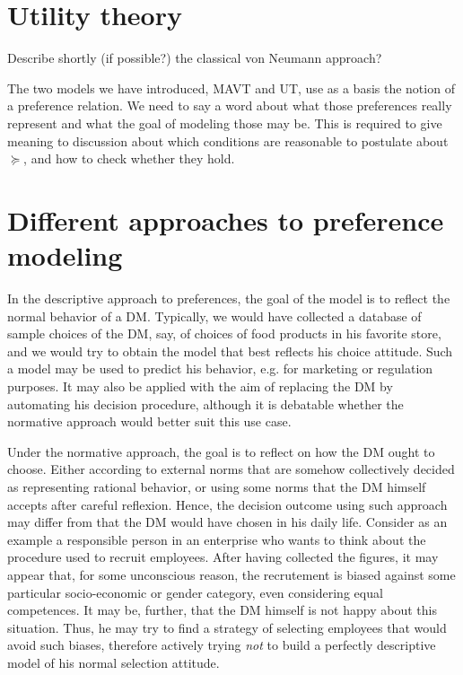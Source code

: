 \documentclass[french, english]{llncs}
\begin{document}
\section{Utility theory}
Describe shortly (if possible?) the classical von Neumann approach?

The two models we have introduced, MAVT and UT, use as a basis the notion of a preference relation. We need to say a word about what those preferences really represent and what the goal of modeling those may be. This is required to give meaning to discussion about which conditions are reasonable to postulate about $\succeq$, and how to check whether they hold.

\section{Different approaches to preference modeling}
In the descriptive approach to preferences, the goal of the model is to reflect the normal behavior of a \ac{DM}. Typically, we would have collected a database of sample choices of the \ac{DM}, say, of choices of food products in his favorite store, and we would try to obtain the model that best reflects his choice attitude. Such a model may be used to predict his behavior, e.g. for marketing or regulation purposes. It may also be applied with the aim of replacing the \ac{DM} by automating his decision procedure, although it is debatable whether the normative approach would better suit this use case.

Under the normative approach, the goal is to reflect on how the \ac{DM} ought to choose. Either according to external norms that are somehow collectively decided as representing rational behavior, or using some norms that the \ac{DM} himself accepts after careful reflexion. Hence, the decision outcome using such approach may differ from that the \ac{DM} would have chosen in his daily life. Consider as an example a responsible person in an enterprise who wants to think about the procedure used to recruit employees. After having collected the figures, it may appear that, for some unconscious reason, the recrutement is biased against some particular socio-economic or gender category, even considering equal competences. It may be, further, that the \ac{DM} himself is not happy about this situation. Thus, he may try to find a strategy of selecting employees that would avoid such biases, therefore actively trying \emph{not} to build a perfectly descriptive model of his normal selection attitude.
\end{document}
